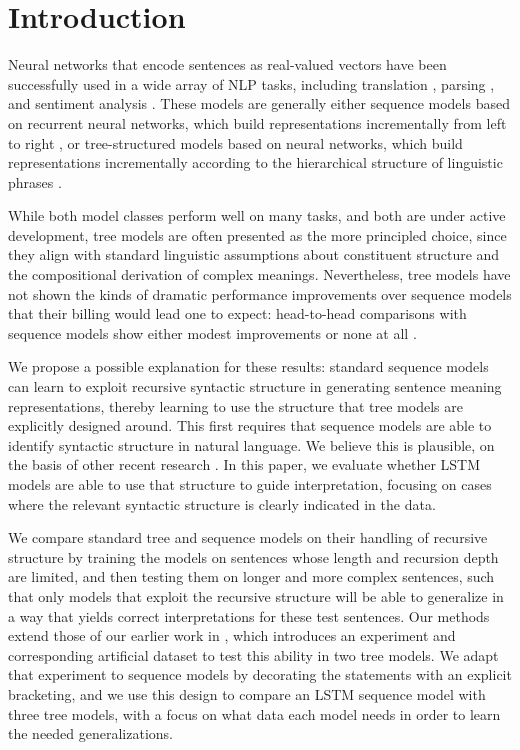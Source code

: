 \section{Introduction}\label{sec:intro}

Neural networks that encode sentences as real-valued vectors have been successfully used in a wide array of NLP tasks, including translation \cite{sutskever2014sequence}, parsing \cite{dyer2015transition}, and sentiment analysis \cite{tai2015improved}. 
These models are generally either 
sequence models based on recurrent neural networks, which build representations incrementally from left to right \cite{elman1990finding,sutskever2014sequence}, or tree-structured models based on  neural networks, which build representations incrementally 
according to the hierarchical structure of linguistic phrases \cite{goller1996learning,socher2011semi}. 

While both model classes perform
well on many tasks, and both are under active development,
tree models are often presented as the more principled choice, since they align with standard linguistic assumptions about constituent structure and the compositional derivation of complex meanings.
Nevertheless,
tree models have not shown the kinds of dramatic performance improvements over sequence models that their billing would lead one to expect: head-to-head comparisons with sequence models show either modest improvements \cite{tai2015improved} or none at all \cite{li2015tree}. 

We propose a possible explanation for these results: standard sequence models can learn to
exploit recursive syntactic structure in generating sentence meaning representations, thereby 
learning to use the 
structure that tree models are explicitly designed around. This first requires that
sequence models are able to identify syntactic structure in natural language. We believe this is plausible, on the basis of other recent research \cite{vinyals2014grammar,Karpathy2015vaurn}.
In this paper, we  evaluate whether LSTM models are able to use that structure to guide interpretation, 
focusing on cases where the relevant syntactic structure is clearly indicated in the data.

We compare standard tree and sequence models on their handling of recursive structure by training the models on sentences whose length and recursion depth are limited, and then testing them on longer and more complex sentences, such that only models that exploit the recursive structure will be able to generalize in a way that yields correct interpretations for these test sentences. Our methods extend those of our earlier work in \cite{Bowman:Potts:Manning:2014}, which introduces an experiment and corresponding artificial dataset to test this ability in two tree models. We adapt that experiment to sequence models by decorating the statements with an explicit bracketing, and we use this design to compare an LSTM sequence model with three tree models, with a focus on what data each model needs in order to learn the needed generalizations. 

